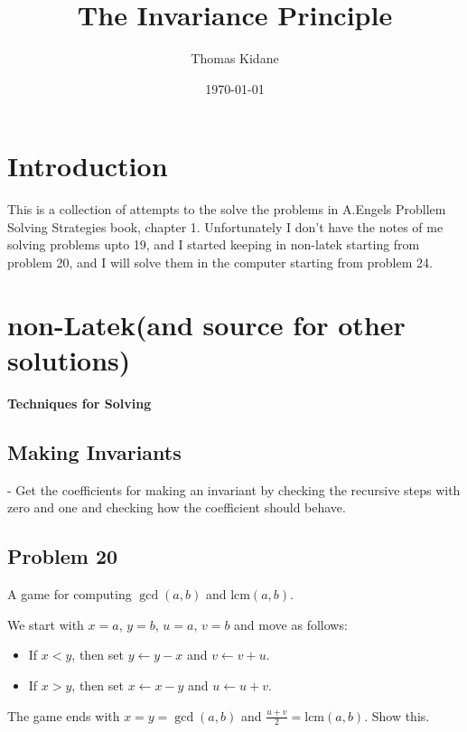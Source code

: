 \documentclass[12pt,tikz,border=10pt]{article}
\title{The Invariance Principle}
\author{Thomas Kidane}
\date{\today}
\theoremstyle{definition}
\theoremstyle{remark}
\begin{document}
\maketitle

\section{Introduction}
This is a collection of attempts to the solve the problems in A.Engels 
Probllem Solving Strategies book, chapter 1.
Unfortunately I don't have the notes of me solving problems upto 19, and I started
keeping in non-latek starting from problem 20, and I will solve them in the 
computer starting from problem 24.

\section{non-Latek(and source for other solutions)}

\textbf{Techniques for Solving}

\subsection{Making Invariants}
- Get the coefficients for making an invariant by checking the recursive steps with zero and one and checking how the coefficient should behave.

\subsection{Problem 20}
A game for computing $\gcd(a, b)$ and $\text{lcm}(a, b)$.

We start with $x = a$, $y = b$, $u = a$, $v = b$ and move as follows:

\begin{itemize}
    \item If $x < y$, then set $y \leftarrow y-x$ and $v \leftarrow v + u$.
    \item If $x > y$, then set $x \leftarrow x-y$ and $u \leftarrow u + v$.
\end{itemize}

The game ends with $x=y=\gcd(a, b)$ and $\frac{u + v}{2} = \text{lcm}(a, b)$. Show this.
\end{document}
